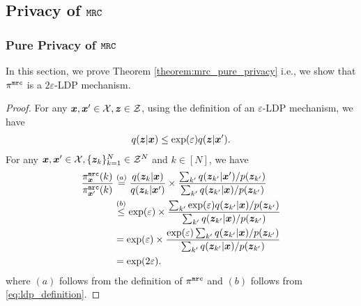 \subsection{Privacy of \texorpdfstring{$\texttt{MRC}$}{MRC}}
\label{appendix:privacy_mrc}
\subsubsection{Pure Privacy of \texorpdfstring{$\texttt{MRC}$}{MRC}}\label{appendix:pure_privacy_mrc}
In this section, we prove Theorem \ref{theorem:mrc_pure_privacy} i.e., we show that $\pi^{\texttt{mrc}}$ is a $2\varepsilon$-LDP mechanism.
\mrcpureprivacy*
\begin{proof}
For any ${\boldsymbol{x}}, {\boldsymbol{x}}' \in \mathcal{X}, {\boldsymbol{z}} \in \mathcal{Z}$, using the definition of an $\varepsilon$-LDP mechanism, we have
\begin{align}
    q({\boldsymbol{z}}|{\boldsymbol{x}}) \leq \exp(\varepsilon) q({\boldsymbol{z}}|{\boldsymbol{x}}'). \label{eq:ldp_definition}
\end{align}
For any ${\boldsymbol{x}}, {\boldsymbol{x}}' \in \mathcal{X}, \{{\boldsymbol{z}}_k\}_{k=1}^{N} \in \mathcal{Z}^N$ and $k \in [N]$, we have
\begin{align}
    \frac{\pi^{\texttt{mrc}}_{{\boldsymbol{x}}}(k)}{\pi^{\texttt{mrc}}_{{\boldsymbol{x}}'}(k)} & \stackrel{(a)}{=} \frac{q({\boldsymbol{z}}_k | {\boldsymbol{x}})}{q({\boldsymbol{z}}_k | {\boldsymbol{x}}')} \times \frac{\sum_{k'} q({\boldsymbol{z}}_{k'} | {\boldsymbol{x}}')/p({\boldsymbol{z}}_{k'})}{\sum_{k'} q({\boldsymbol{z}}_{k'} | {\boldsymbol{x}})/p({\boldsymbol{z}}_{k'})} \\
    & \stackrel{(b)}{\leq} \exp(\varepsilon) \times \frac{\sum_{k'} \exp(\varepsilon) q({\boldsymbol{z}}_{k'} | {\boldsymbol{x}})/p({\boldsymbol{z}}_{k'})}{\sum_{k'} q({\boldsymbol{z}}_{k'} | {\boldsymbol{x}})/p({\boldsymbol{z}}_{k'})} \\
    & = \exp(\varepsilon) \times \frac{\exp(\varepsilon) \sum_{k'}  q({\boldsymbol{z}}_{k'} | {\boldsymbol{x}})/p({\boldsymbol{z}}_{k'})}{\sum_{k'} q({\boldsymbol{z}}_{k'} | {\boldsymbol{x}})/p({\boldsymbol{z}}_{k'})} \\
    & = \exp(2\varepsilon).
\end{align}
where $(a)$ follows from the definition of $\pi^{\texttt{mrc}}$ and $(b)$ follows from \eqref{eq:ldp_definition}.
\end{proof}

